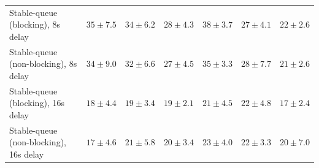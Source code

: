 \begin{table}[H]
{\begin{tabular}{l w{c}{5.0em} w{c}{5.0em} w{c}{5.0em} w{c}{5.0em} w{c}{5.0em} w{c}{5.0em}}
Stable-queue (blocking), 8s delay & $35\pm7.5$ & $34\pm6.2$ & $28\pm4.3$ & $38\pm3.7$ & $27\pm4.1$ & $22\pm2.6$ \\
Stable-queue (non-blocking), 8s delay & $34\pm9.0$ & $32\pm6.6$ & $27\pm4.5$ & $35\pm3.3$ & $28\pm7.7$ & $21\pm2.6$ \\
Stable-queue (blocking), 16s delay & $18\pm4.4$ & $19\pm3.4$ & $19\pm2.1$ & $21\pm4.5$ & $22\pm4.8$ & $17\pm2.4$ \\
Stable-queue (non-blocking), 16s delay & $17\pm4.6$ & $21\pm5.8$ & $20\pm3.4$ & $23\pm4.0$ & $22\pm3.3$ & $20\pm7.0$ \\
\bottomrule
\end{tabular}%
}
\end{table}
